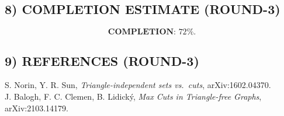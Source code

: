 \subsection*{8) COMPLETION ESTIMATE (ROUND-3)}
\[
\textbf{COMPLETION: }72\%.
\]

\subsection*{9) REFERENCES (ROUND-3)}
S. Norin, Y. R. Sun, \emph{Triangle-independent sets vs.\ cuts}, arXiv:1602.04370.\\
J. Balogh, F. C. Clemen, B. Lidick\'y, \emph{Max Cuts in Triangle-free Graphs}, arXiv:2103.14179.

